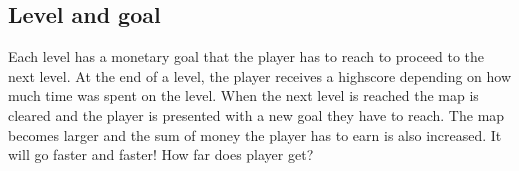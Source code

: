 \subsection*{Level and goal}
    Each level has a monetary goal that the player has to reach to proceed to
    the next level. At the end of a level, the player receives a highscore
    depending on how much time was spent on the level. When  the next level is
    reached the map is cleared and the player is presented with a new goal they
    have to reach. The map becomes larger and the sum of money the player has to
    earn is also increased. It will go faster and faster! How far does player
    get?
